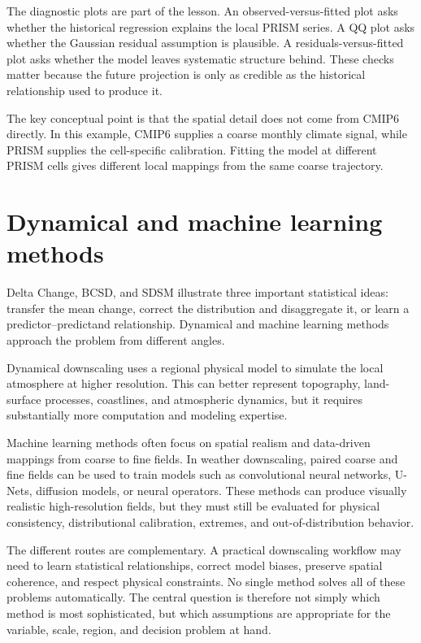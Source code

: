 \documentclass[11pt]{article}
\begin{document}
The diagnostic plots are part of the lesson. An observed-versus-fitted plot asks whether the historical regression explains the local PRISM series. A QQ plot asks whether the Gaussian residual assumption is plausible. A residuals-versus-fitted plot asks whether the model leaves systematic structure behind. These checks matter because the future projection is only as credible as the historical relationship used to produce it.

The key conceptual point is that the spatial detail does not come from CMIP6 directly. In this example, CMIP6 supplies a coarse monthly climate signal, while PRISM supplies the cell-specific calibration. Fitting the model at different PRISM cells gives different local mappings from the same coarse trajectory.

\section{Dynamical and machine learning methods}

Delta Change, BCSD, and SDSM illustrate three important statistical ideas: transfer the mean change, correct the distribution and disaggregate it, or learn a predictor--predictand relationship. Dynamical and machine learning methods approach the problem from different angles.

Dynamical downscaling uses a regional physical model to simulate the local atmosphere at higher resolution. This can better represent topography, land-surface processes, coastlines, and atmospheric dynamics, but it requires substantially more computation and modeling expertise.

Machine learning methods often focus on spatial realism and data-driven mappings from coarse to fine fields. In weather downscaling, paired coarse and fine fields can be used to train models such as convolutional neural networks, U-Nets, diffusion models, or neural operators. These methods can produce visually realistic high-resolution fields, but they must still be evaluated for physical consistency, distributional calibration, extremes, and out-of-distribution behavior.

The different routes are complementary. A practical downscaling workflow may need to learn statistical relationships, correct model biases, preserve spatial coherence, and respect physical constraints. No single method solves all of these problems automatically. The central question is therefore not simply which method is most sophisticated, but which assumptions are appropriate for the variable, scale, region, and decision problem at hand.
\end{document}
